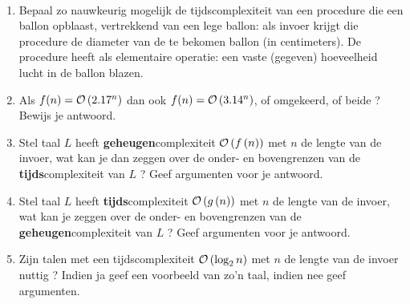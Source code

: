 \documentclass{article}
\begin{document}
\begin{question}[Complexiteitstheorie]
~~
\begin{enumerate}
\item Bepaal zo nauwkeurig mogelijk de tijdscomplexiteit van een
procedure die een ballon opblaast, vertrekkend van een lege ballon:
als invoer krijgt die procedure de diameter van de te bekomen ballon
(in centimeters). De procedure heeft als elementaire operatie: een
vaste (gegeven) hoeveelheid lucht in de ballon blazen.

\item Als $f(n) = \mathcal{O}\left( 2.17^n \right)$ dan ook $f(n) = \mathcal{O}\left( 3.14^n \right)$, of
omgekeerd, of beide ? Bewijs je antwoord.

\item Stel taal $L$ heeft {\bf geheugen}complexiteit
$\mathcal{O}\left( f\left( n \right) \right)$ met $n$ de lengte van de invoer, wat kan je dan
zeggen over de onder- en bovengrenzen van de {\bf tijds}complexiteit van $L$ ?
Geef argumenten voor je antwoord.

\item Stel taal $L$ heeft {\bf tijds}complexiteit $\mathcal{O}\left( g\left( n \right) \right)$
met $n$ de lengte van de invoer, wat kan je zeggen over de onder- en
bovengrenzen van de {\bf geheugen}complexiteit van $L$ ? Geef argumenten voor
je antwoord.

\item Zijn talen met een tijdscomplexiteit $\mathcal{O}\left( \log_2 n \right)$ met $n$
de lengte van de invoer nuttig ? Indien ja geef een voorbeeld van zo'n
taal, indien nee geef argumenten.


\end{enumerate}
\end{question}
\end{document}
